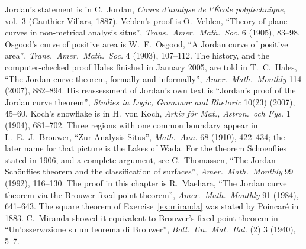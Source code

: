 Jordan's statement is in C.~Jordan, \emph{Cours d'analyse de l'\'Ecole polytechnique}, vol.~3 (Gauthier-Villars, 1887). Veblen's proof is O.~Veblen, ``Theory of plane curves in non-metrical analysis situs'', \emph{Trans.\ Amer.\ Math.\ Soc.}
6 (1905), 83--98. Osgood's curve of positive area is W.~F.~Osgood, ``A Jordan curve of positive area'', \emph{Trans.\ Amer.\ Math.\ Soc.} 4 (1903), 107--112. The history, and the computer-checked proof Hales finished in January 2005, are told in T.~C.~Hales, ``The Jordan curve theorem, formally and informally'', \emph{Amer.\ Math.\
Monthly} 114 (2007), 882--894. His reassessment of Jordan's own text is ``Jordan's proof of the Jordan curve theorem'', \emph{Studies in Logic, Grammar and Rhetoric}
10(23) (2007), 45--60. Koch's snowflake is in H.~von Koch, \emph{Arkiv f\"or Mat., Astron.\ och Fys.} 1 (1904), 681--702. Three regions with one common boundary appear in L.~E.~J.~Brouwer, ``Zur Analysis
Situs'', \emph{Math.\ Ann.} 68 (1910), 422--434; the later name for that picture is the Lakes of Wada. For the theorem Schoenflies stated in 1906, and a complete argument, see C.~Thomassen, ``The Jordan--Sch\"onflies theorem and the classification of surfaces'', \emph{Amer.\ Math.\ Monthly} 99
(1992), 116--130. The proof in this chapter is R.~Maehara, ``The Jordan curve theorem via the Brouwer fixed point theorem'', \emph{Amer.\
Math.\ Monthly} 91 (1984), 641--643. The square theorem of Exercise~\ref{ex:miranda} was stated by Poincar\'e in 1883. C.~Miranda showed it equivalent to Brouwer's fixed-point theorem in
``Un'osservazione su un teorema di Brouwer'', \emph{Boll.\ Un.\ Mat.\ Ital.} (2) 3 (1940), 5--7.
